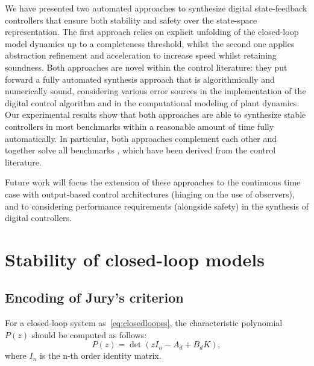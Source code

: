 \documentclass[runningheads,a4paper]{llncs}
\newcommand{\addtodo}[1]{{\color{red} TODO: #1}}
\begin{document}
We have presented two automated approaches to synthesize digital state-feedback controllers 
that ensure both stability and safety over the state-space representation.
The first approach relies on explicit unfolding of the closed-loop model dynamics 
up to a completeness threshold, whilst the second one applies abstraction 
refinement and acceleration to increase speed whilst retaining soundness.
%
Both approaches are novel within the control literature: they put 
forward a fully automated synthesis approach that is algorithmically and
numerically sound, considering various error sources in the implementation 
of the digital control algorithm and in the computational modeling of plant dynamics. 
%
Our experimental results show that both approaches are able
to synthesize stable controllers in most benchmarks within a reasonable
amount of time fully automatically.  In particular, both approaches
complement each other and together solve all benchmarks , which have been derived from the control literature.

Future work will focus the extension of these approaches to the continuous time case with output-based control architectures (hinging on the use of observers), 
and to considering performance requirements (alongside safety) in the synthesis of digital controllers.  


\newpage


  

\newpage
\appendix
\section{Stability of closed-loop models}
\label{sec:appendix-stability}


\subsection{Encoding of Jury's criterion}

For a closed-loop system as~\eqref{eq:closedloopss}, 
the characteristic polynomial $P(z)$ should be computed as follows:
\begin{equation}
P(z)= \det( z I_{n} - A_d + B_d K ),
\end{equation}
where $I_{n}$ is the n-th order identity matrix. 
\end{document}
